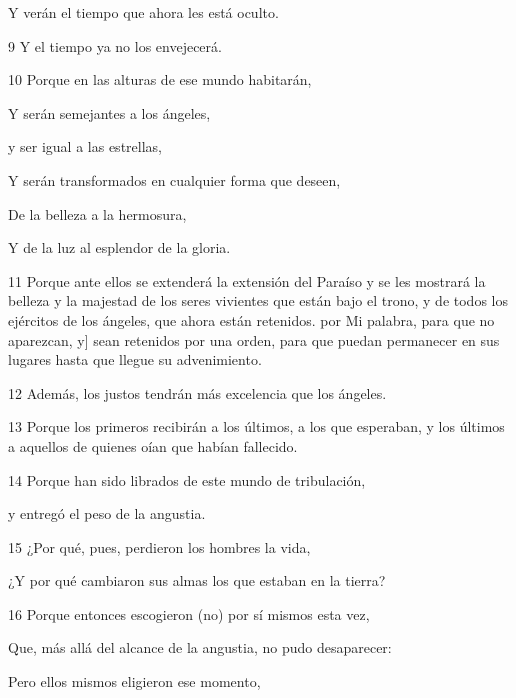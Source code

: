 Y verán el tiempo que ahora les está oculto.

\par 9 Y el tiempo ya no los envejecerá.

\par 10 Porque en las alturas de ese mundo habitarán,

Y serán semejantes a los ángeles,

\par y ser igual a las estrellas,

\par Y serán transformados en cualquier forma que deseen,

\par De la belleza a la hermosura,

\par Y de la luz al esplendor de la gloria.

\par 11 Porque ante ellos se extenderá la extensión del Paraíso y se les mostrará la belleza y la majestad de los seres vivientes que están bajo el trono, y de todos los ejércitos de los ángeles, que ahora están retenidos. por Mi palabra, para que no aparezcan, y] sean retenidos por una orden, para que puedan permanecer en sus lugares hasta que llegue su advenimiento.

\par 12 Además, los justos tendrán más excelencia que los ángeles.

\par 13 Porque los primeros recibirán a los últimos, a los que esperaban, y los últimos a aquellos de quienes oían que habían fallecido.

\par 14 Porque han sido librados de este mundo de tribulación,

\par y entregó el peso de la angustia.

\par 15 ¿Por qué, pues, perdieron los hombres la vida,

¿Y por qué cambiaron sus almas los que estaban en la tierra?

\par 16 Porque entonces escogieron (no) por sí mismos esta vez,

\par Que, más allá del alcance de la angustia, no pudo desaparecer:

\par Pero ellos mismos eligieron ese momento,

